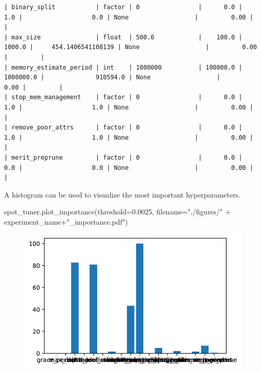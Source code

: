 \documentclass[
  letterpaper,
  DIV=11,
  numbers=noendperiod]{scrreprt}
\newenvironment{Shaded}{\begin{snugshade}}{\end{snugshade}}
\newcommand{\FloatTok}[1]{\textcolor[rgb]{0.68,0.00,0.00}{#1}}
\newcommand{\NormalTok}[1]{\textcolor[rgb]{0.00,0.23,0.31}{#1}}
\newcommand{\OperatorTok}[1]{\textcolor[rgb]{0.37,0.37,0.37}{#1}}
\newcommand{\StringTok}[1]{\textcolor[rgb]{0.13,0.47,0.30}{#1}}
\begin{document}
\begin{verbatim}
| binary_split           | factor | 0                |      0.0 |       1.0 |                   0.0 | None                  |         0.00 |         |
| max_size               | float  | 500.0            |    100.0 |    1000.0 |     454.1406541108139 | None                  |         0.00 |         |
| memory_estimate_period | int    | 1000000          | 100000.0 | 1000000.0 |              910594.0 | None                  |         0.00 |         |
| stop_mem_management    | factor | 0                |      0.0 |       1.0 |                   1.0 | None                  |         0.00 |         |
| remove_poor_attrs      | factor | 0                |      0.0 |       1.0 |                   1.0 | None                  |         0.00 |         |
| merit_preprune         | factor | 0                |      0.0 |       0.0 |                   0.0 | None                  |         0.00 |         |
\end{verbatim}

A histogram can be used to visualize the most important hyperparameters.

\begin{Shaded}
\begin{Highlighting}[]
\NormalTok{spot\_tuner.plot\_importance(threshold}\OperatorTok{=}\FloatTok{0.0025}\NormalTok{, filename}\OperatorTok{=}\StringTok{"./figures/"} \OperatorTok{+}\NormalTok{ experiment\_name}\OperatorTok{+}\StringTok{"\_importance.pdf"}\NormalTok{)}
\end{Highlighting}
\end{Shaded}

\begin{figure}[H]

{\centering \includegraphics{024_spot_hpt_river_friedman_hatr_files/figure-pdf/cell-23-output-1.pdf}

}

\end{figure}
\end{document}
